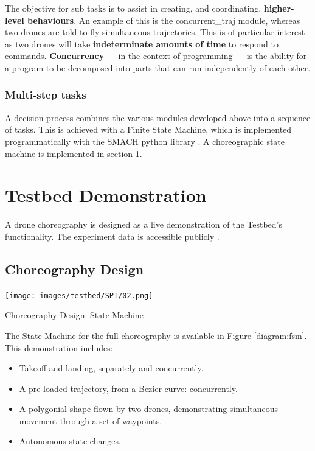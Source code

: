 The objective for sub tasks is to assist in creating, and coordinating, \textbf{higher-level behaviours}. An example of this is the concurrent\_traj module, whereas two drones are told to fly simultaneous trajectories. This is of particular interest as two drones will take \textbf{indeterminate amounts of time} to respond to commands. \textbf{Concurrency} — in the context of programming — is the ability for a program to be decomposed into parts that can run independently of each other. 

\subsubsection{Multi-step tasks}

A decision process combines the various modules developed above into a sequence of tasks. This is achieved with a Finite State Machine, which is implemented programmatically with the SMACH python library \cite{smach}. A choreographic state machine is implemented in section \ref{section:choreography}.


\pagebreak
\section{Testbed Demonstration}\label{section:choreography}

A drone choreography is designed as a live demonstration of the Testbed's functionality. The experiment data is accessible publicly \cite{choreography_data}.
 

\subsection{Choreography Design}

 \begin{marginfigure}%
    \texttt{[image: images/testbed/SPI/02.png]}
    \caption{Choreography Design: State Machine}\label{diagram:fsm}
\end{marginfigure}%

The State Machine for the full choreography is available in Figure \ref{diagram:fsm}. This demonstration includes:
\begin{itemize}
\item Takeoff and landing, separately and concurrently.
\item A pre-loaded trajectory, from a Bezier curve: concurrently.
\item A polygonial shape flown by two drones, demonstrating simultaneous movement through a set of waypoints.
\item Autonomous state changes.
\end{itemize}

